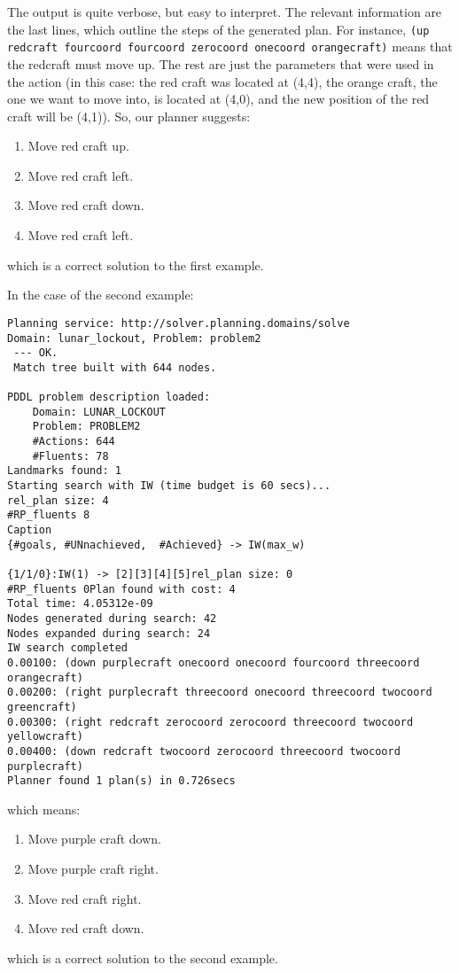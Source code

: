 \documentclass{article}
\begin{document}
\begin{enumerate}
The output is quite verbose, but easy to interpret. The relevant information are the last lines, which outline the steps of the generated plan. For instance, \texttt{(up redcraft fourcoord fourcoord zerocoord onecoord orangecraft)}  means that the redcraft must move up. The rest are just the parameters that were used in the action (in this case: the red craft was located at (4,4), the orange craft, the one we want to move into, is located at (4,0), and the new position of the red craft will be (4,1)). So, our planner suggests:
\begin{enumerate}
    \item Move red craft up.
    \item Move red craft left.
    \item Move red craft down.
    \item Move red craft left.
\end{enumerate}
which is a correct solution to the first example.

In the case of the second example:
\begin{verbatim}
Planning service: http://solver.planning.domains/solve
Domain: lunar_lockout, Problem: problem2
 --- OK.
 Match tree built with 644 nodes.

PDDL problem description loaded: 
	Domain: LUNAR_LOCKOUT
	Problem: PROBLEM2
	#Actions: 644
	#Fluents: 78
Landmarks found: 1
Starting search with IW (time budget is 60 secs)...
rel_plan size: 4
#RP_fluents 8
Caption
{#goals, #UNnachieved,  #Achieved} -> IW(max_w)

{1/1/0}:IW(1) -> [2][3][4][5]rel_plan size: 0
#RP_fluents 0Plan found with cost: 4
Total time: 4.05312e-09
Nodes generated during search: 42
Nodes expanded during search: 24
IW search completed
0.00100: (down purplecraft onecoord onecoord fourcoord threecoord orangecraft)
0.00200: (right purplecraft threecoord onecoord threecoord twocoord greencraft)
0.00300: (right redcraft zerocoord zerocoord threecoord twocoord yellowcraft)
0.00400: (down redcraft twocoord zerocoord threecoord twocoord purplecraft)
Planner found 1 plan(s) in 0.726secs
\end{verbatim}
which means:
\begin{enumerate}
    \item Move purple craft down.
    \item Move purple craft right.
    \item Move red craft right.
    \item Move red craft down.
\end{enumerate}
which is a correct solution to the second example.


\end{enumerate}
\end{document}
